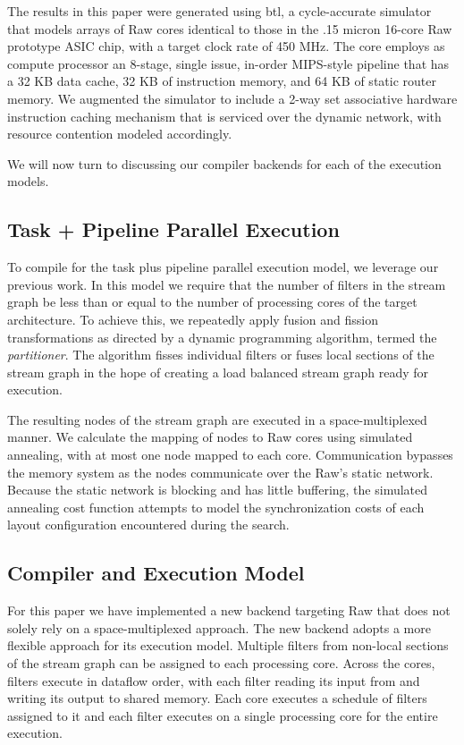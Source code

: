 The results in this paper were generated using btl, a cycle-accurate
simulator that models arrays of Raw cores identical to those in the
.15 micron 16-core Raw prototype ASIC chip, with a target clock rate
of 450 MHz. The core employs as compute processor an 8-stage, single
issue, in-order MIPS-style pipeline that has a 32 KB data cache, 32 KB
of instruction memory, and 64 KB of static router memory.  We
augmented the simulator to include a 2-way set associative hardware
instruction caching mechanism that is serviced over the dynamic
network, with resource contention modeled accordingly. 

We will now turn to discussing our compiler backends for each of the
execution models.

\subsection{Task + Pipeline Parallel Execution}
\label{sec:space-imp}
To compile for the task plus pipeline parallel execution model, we
leverage our previous work\cite{streamit-asplos}. In this model we
require that the number of filters in the stream graph be less than or
equal to the number of processing cores of the target architecture.
To achieve this, we repeatedly apply fusion and fission
transformations as directed by a dynamic programming algorithm, termed
the {\it partitioner}.  The algorithm fisses individual filters or
fuses local sections of the stream graph in the hope of creating a
load balanced stream graph ready for execution.

The resulting nodes of the stream graph are executed in a
space-multiplexed manner.  We calculate the mapping of nodes to Raw
cores using simulated annealing, with at most one node mapped to each
core.  Communication bypasses the memory system as the nodes
communicate over the Raw's static network.  Because the static network
is blocking and has little buffering, the simulated annealing cost
function attempts to model the synchronization costs of each layout
configuration encountered during the search. 

\subsection{Compiler and Execution Model}
For this paper we have implemented a new backend targeting Raw that
does not solely rely on a space-multiplexed approach.  The new backend
adopts a more flexible approach for its execution model. Multiple
filters from non-local sections of the stream graph can be assigned to
each processing core.  Across the cores, filters execute in dataflow
order, with each filter reading its input from and writing its output
to shared memory. Each core executes a schedule of filters assigned to
it and each filter executes on a single processing core for the entire
execution.

